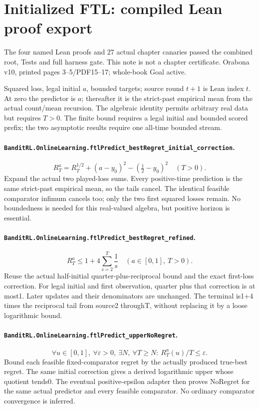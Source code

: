 \section{Initialized FTL: compiled Lean proof export}
The four named Lean proofs and 27 actual chapter canaries passed the combined root, Tests and full harness gate. This note is not a chapter certificate. Orabona v10, printed pages 3--5/PDF15--17; whole-book Goal active.\par
Squared loss, legal initial $a$, bounded targets; source round $t+1$ is Lean index $t$. At zero the predictor is $a$; thereafter it is the strict-past empirical mean from the actual count/mean recursion. The algebraic identity permits arbitrary real data but requires $T>0$. The finite bound requires a legal initial and bounded scored prefix; the two asymptotic results require one all-time bounded stream.\par
\paragraph{\texttt{BanditRL.OnlineLearning.ftlPredict\_bestRegret\_initial\_correction}.}
\[R_T^{a}=R_T^{1/2}+(a-y_0)^2-(\tfrac12-y_0)^2\quad(T>0).\]
Expand the actual two played-loss sums. Every positive-time prediction is the same strict-past empirical mean, so the tails cancel. The identical feasible comparator infimum cancels too; only the two first squared losses remain. No boundedness is needed for this real-valued algebra, but positive horizon is essential.\par
\paragraph{\texttt{BanditRL.OnlineLearning.ftlPredict\_bestRegret\_refined}.}
\[R_T^{a}\le1+4\sum_{s=2}^{T}\frac1s\quad(a\in[0,1],\ T>0).\]
Reuse the actual half-initial quarter-plus-reciprocal bound and the exact first-loss correction. For legal initial and first observation, quarter plus that correction is at most1. Later updates and their denominators are unchanged. The terminal is1+4 times the reciprocal tail from source2 throughT, without replacing it by a loose logarithmic bound.\par
\paragraph{\texttt{BanditRL.OnlineLearning.ftlPredict\_upperNoRegret}.}
\[\forall u\in[0,1],\ \forall\varepsilon>0,\ \exists N,\ \forall T\ge N:\ R_T^{a}(u)/T\le\varepsilon.\]
Bound each feasible fixed-comparator regret by the actually produced true-best regret. The same initial correction gives a derived logarithmic upper whose quotient tends0. The eventual positive-epsilon adapter then proves NoRegret for the same actual predictor and every feasible comparator. No ordinary comparator convergence is inferred.\par

